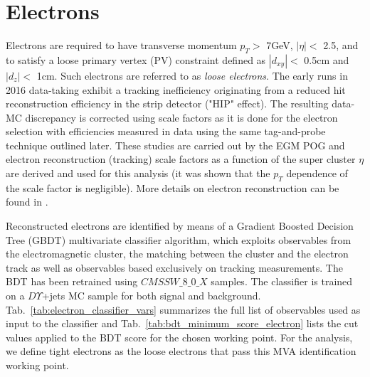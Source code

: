 \section{Electrons}
Electrons are required to have transverse momentum $p_{T}>$ 7GeV, $|\eta|<$ 2.5, and to satisfy a loose primary vertex (PV) constraint defined as $|d_{xy}|<$ 0.5cm and $|d_{z}|<$ 1cm. Such electrons are referred to as \textit{loose electrons}. The early runs in 2016 data-taking exhibit a tracking inefficiency originating from a reduced hit reconstruction efficiency in the strip detector ("HIP" effect). The resulting data-MC discrepancy is corrected using scale factors as it is done for the electron selection with efficiencies measured in data using the same tag-and-probe technique outlined later. These studies are carried out by the EGM POG and electron reconstruction (tracking) scale factors as a function of the super cluster $\eta$ are derived and used for this analysis (it was shown that the $p_{T}$ dependence of the scale factor is negligible). More details on electron reconstruction can be found in \cite{bib:JINST-10-2015-P06005}.

Reconstructed electrons are identified by means of a Gradient Boosted Decision Tree (GBDT) multivariate classifier algorithm, which exploits observables from the electromagnetic cluster, the matching between the cluster and the electron track as well as observables based exclusively on tracking measurements. The BDT has been retrained using $CMSSW\_8\_0\_X$ samples. The classifier is trained on a $D\varUpsilon$+jets MC sample for both signal and background. Tab.~\ref{tab:electron_classifier_vars} summarizes the full list of observables used as input to the classifier and Tab.~\ref{tab:bdt_minimum_score_electron} lists the cut values applied to the BDT score for the chosen working point. For the analysis, we define tight electrons as the loose electrons that pass this MVA identification working point.

